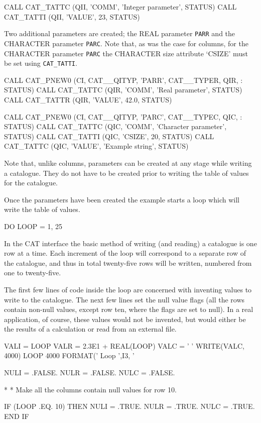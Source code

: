 \documentclass[11pt,twoside]{starlink}
\begin{document}
\begin{terminalv}
         CALL CAT_TATTC (QII, 'COMM', 'Integer parameter', STATUS)
         CALL CAT_TATTI (QII, 'VALUE', 23, STATUS)
\end{terminalv}

Two additional parameters are created; the REAL parameter \texttt{PARR} and
the CHARACTER parameter \texttt{PARC}. Note that, as was the case for
columns, for the CHARACTER parameter \texttt{PARC} the CHARACTER size
attribute `CSIZE' must be set using \texttt{CAT\_TATTI}.

\begin{terminalv}
         CALL CAT_PNEW0 (CI, CAT__QITYP, 'PARR', CAT__TYPER, QIR,
     :     STATUS)
         CALL CAT_TATTC (QIR, 'COMM', 'Real parameter', STATUS)
         CALL CAT_TATTR (QIR, 'VALUE', 42.0, STATUS)

         CALL CAT_PNEW0 (CI, CAT__QITYP, 'PARC', CAT__TYPEC, QIC,
     :     STATUS)
         CALL CAT_TATTC (QIC, 'COMM', 'Character parameter', STATUS)
         CALL CAT_TATTI (QIC, 'CSIZE', 20, STATUS)
         CALL CAT_TATTC (QIC, 'VALUE', 'Example string', STATUS)
\end{terminalv}

Note that, unlike columns, parameters can be created at any stage
while writing a catalogue. They do not have to be created prior to
writing the table of values for the catalogue.

Once the parameters have been created the example starts a loop which
will write the table of values.

\begin{terminalv}
         DO LOOP = 1, 25
\end{terminalv}

In the CAT interface the basic method of writing (and reading) a
catalogue is one row at a time. Each increment of the loop will
correspond to a separate row of the catalogue, and thus in total
twenty-five rows will be written, numbered from one to twenty-five.

The first few lines of code inside the loop are concerned with inventing
values to write to the catalogue. The next few lines  set the null value
flags (all the rows contain non-null values, except row ten, where the
flags are set to null). In a real application, of course, these values
would not be invented, but would either be the results of a calculation
or read from an external file.

\begin{terminalv}
            VALI = LOOP
            VALR = 2.3E1 + REAL(LOOP)
            VALC = ' '
            WRITE(VALC, 4000) LOOP
 4000       FORMAT(' Loop ',I3, '%

            NULI = .FALSE.
            NULR = .FALSE.
            NULC = .FALSE.

*
*          Make all the columns contain null values for row 10.

            IF (LOOP .EQ. 10) THEN
               NULI = .TRUE.
               NULR = .TRUE.
               NULC = .TRUE.
            END IF
\end{terminalv}
\end{document}
